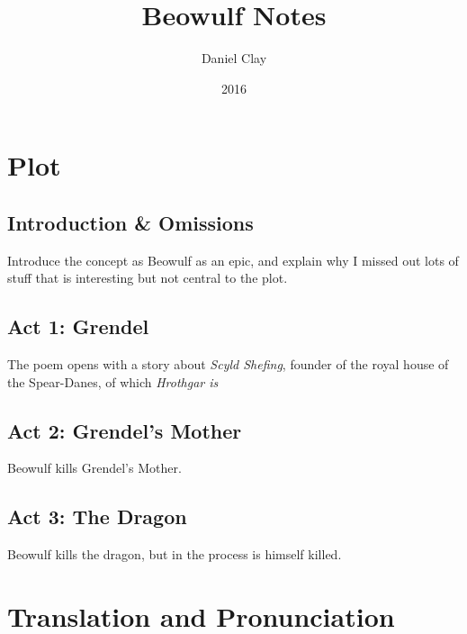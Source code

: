\documentclass[a4paper]{article}
\begin{document}
\title{Beowulf Notes}
\date{2016}
\author{
Daniel Clay \\ 
}
\maketitle

\section{Plot}

\subsection{Introduction \& Omissions}%

Introduce the concept as Beowulf as an epic, and explain why I missed out lots of
stuff that is interesting but not central to the plot. 

\subsection{Act 1: Grendel}%

The poem opens with a story about \textit{Scyld Shefing}, founder of the royal house
of the Spear-Danes, of which \textit{Hrothgar is } 

\subsection{Act 2: Grendel's Mother}%

Beowulf kills Grendel's Mother.

\subsection{Act 3: The Dragon}%

Beowulf kills the dragon, but in the process is himself killed.

\section{Translation and Pronunciation}
\end{document}
